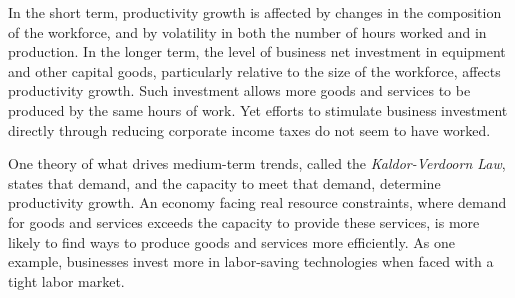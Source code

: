 \begin{minipage}{0.76\textwidth}
\small 

\vspace{3.4cm}

\hspace{5mm} 

\vspace{1mm}

\small In the short term, productivity growth is affected by changes in the composition of the workforce, and by volatility in both the number of hours worked and in production. In the longer term, the level of business net investment in equipment and other capital goods, particularly relative to the size of the workforce, affects productivity growth. Such investment allows more goods and services to be produced by the same hours of work. Yet efforts to stimulate business investment directly through reducing corporate income taxes do not seem to have worked. 

One theory of what drives medium-term trends, called the \textit{Kaldor-Verdoorn Law}, states that demand, and the capacity to meet that demand, determine productivity growth. An economy facing real resource constraints, where demand for goods and services exceeds the capacity to provide these services, is more likely to find ways to produce goods and services more efficiently. As one example, businesses invest more in labor-saving technologies when faced with a tight labor market. 
\end{minipage}
\newpage

